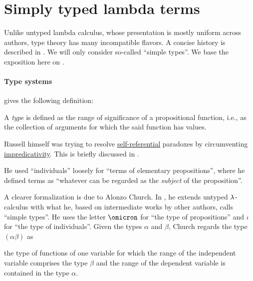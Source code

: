 \section{Simply typed lambda terms}\label{sec:simply_typed_lambda_terms}

Unlike untyped lambda calculus, whose presentation is mostly uniform across authors, type theory has many incompatible flavors. A concise history is described in . We will only consider so-called \enquote{simple types}. We base the exposition here on .

\paragraph{Type systems}

\begin{remark}\label{rem:type_theory}
   gives the following definition:
  \begin{displayquote}
    A \textit{type} is defined as the range of significance of a propositional function, i.e., as the collection of arguments for which the said function has values.
  \end{displayquote}

  Russell himself was trying to resolve \hyperref[rem:self_reference]{self-referential} paradoxes by circumventing \hyperref[con:impredicativity]{impredicativity}. This is briefly discussed in .

  He used \enquote{individuals} loosely for \enquote{terms of elementary propositions}, where he defined terms as \enquote{whatever can be regarded as the \textit{subject} of the proposition}.

  A clearer formalization is due to Alonzo Church. In \cite{Church1940STT}, he extends untyped \( \mathrm{\lambda} \)-calculus with what he, based on intermediate works by other authors, calls \enquote{simple types}. He uses the letter \( \omicron \) for \enquote{the type of propositions} and \( \iota \) for \enquote{the type of individuals}. Given the types \( \alpha \) and \( \beta \), Church regards the type \( (\alpha\beta) \) as
  \begin{displayquote}
    \textellipsis the type of functions of one variable for which the range of the independent variable comprises the type \( \beta \) and the range of the dependent variable is contained in the type \( \alpha \).
  \end{displayquote}


\end{remark}
